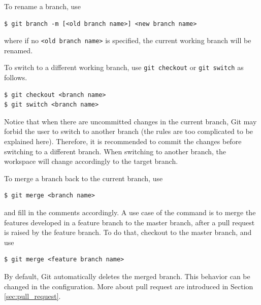 To rename a branch, use
\begin{lstlisting}
$ git branch -m [<old branch name>] <new branch name>
\end{lstlisting}
where if no \verb|<old branch name>| is specified, the current working branch will be renamed.

To switch to a different working branch, use \verb|git checkout| or \verb|git switch| as follows.
\begin{lstlisting}
$ git checkout <branch name>
$ git switch <branch name>
\end{lstlisting}
Notice that when there are uncommitted changes in the current branch, Git may forbid the user to switch to another branch (the rules are too complicated to be explained here). Therefore, it is recommended to commit the changes before switching to a different branch. When switching to another branch, the workspace will change accordingly to the target branch.

To merge a branch back to the current branch, use
\begin{lstlisting}
$ git merge <branch name>
\end{lstlisting}
and fill in the comments accordingly. A use case of the command is to merge the features developed in a feature branch to the master branch, after a pull request is raised by the feature branch. To do that, checkout to the master branch, and use
\begin{lstlisting}
$ git merge <feature branch name>
\end{lstlisting}
By default, Git automatically deletes the merged branch. This behavior can be changed in the configuration. More about pull request are introduced in Section \ref{sec:pull_request}.

